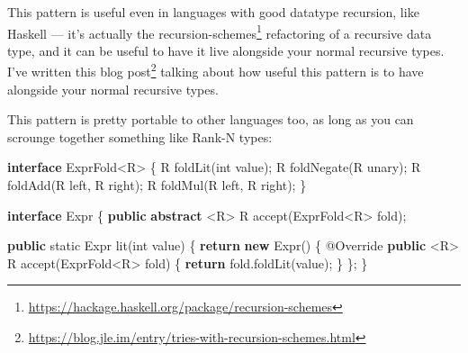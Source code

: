 \documentclass[]{article}
\newenvironment{Shaded}{}{}
\newcommand{\AttributeTok}[1]{\textcolor[rgb]{0.49,0.56,0.16}{#1}}
\newcommand{\ControlFlowTok}[1]{\textcolor[rgb]{0.00,0.44,0.13}{\textbf{#1}}}
\newcommand{\DataTypeTok}[1]{\textcolor[rgb]{0.56,0.13,0.00}{#1}}
\newcommand{\FunctionTok}[1]{\textcolor[rgb]{0.02,0.16,0.49}{#1}}
\newcommand{\KeywordTok}[1]{\textcolor[rgb]{0.00,0.44,0.13}{\textbf{#1}}}
\newcommand{\NormalTok}[1]{#1}
\newcommand{\OperatorTok}[1]{\textcolor[rgb]{0.40,0.40,0.40}{#1}}
\renewcommand{\href}[2]{#2\footnote{\url{#1}}}
\begin{document}
This pattern is useful even in languages with good datatype recursion, like
Haskell --- it's actually the
\href{https://hackage.haskell.org/package/recursion-schemes}{recursion-schemes}
refactoring of a recursive data type, and it can be useful to have it live
alongside your normal recursive types. I've written
\href{https://blog.jle.im/entry/tries-with-recursion-schemes.html}{this blog
post} talking about how useful this pattern is to have alongside your normal
recursive types.

This pattern is pretty portable to other languages too, as long as you can
scrounge together something like Rank-N types:

\begin{Shaded}
\begin{Highlighting}[]
\KeywordTok{interface}\NormalTok{ ExprFold}\OperatorTok{\textless{}}\NormalTok{R}\OperatorTok{\textgreater{}} \OperatorTok{\{}
\NormalTok{    R }\FunctionTok{foldLit}\OperatorTok{(}\DataTypeTok{int}\NormalTok{ value}\OperatorTok{);}
\NormalTok{    R }\FunctionTok{foldNegate}\OperatorTok{(}\NormalTok{R unary}\OperatorTok{);}
\NormalTok{    R }\FunctionTok{foldAdd}\OperatorTok{(}\NormalTok{R left}\OperatorTok{,}\NormalTok{ R right}\OperatorTok{);}
\NormalTok{    R }\FunctionTok{foldMul}\OperatorTok{(}\NormalTok{R left}\OperatorTok{,}\NormalTok{ R right}\OperatorTok{);}
\OperatorTok{\}}

\KeywordTok{interface}\NormalTok{ Expr }\OperatorTok{\{}
    \KeywordTok{public} \KeywordTok{abstract} \OperatorTok{\textless{}}\NormalTok{R}\OperatorTok{\textgreater{}}\NormalTok{ R }\FunctionTok{accept}\OperatorTok{(}\NormalTok{ExprFold}\OperatorTok{\textless{}}\NormalTok{R}\OperatorTok{\textgreater{}}\NormalTok{ fold}\OperatorTok{);}

    \KeywordTok{public} \DataTypeTok{static}\NormalTok{ Expr }\FunctionTok{lit}\OperatorTok{(}\DataTypeTok{int}\NormalTok{ value}\OperatorTok{)} \OperatorTok{\{}
        \ControlFlowTok{return} \KeywordTok{new} \FunctionTok{Expr}\OperatorTok{()} \OperatorTok{\{}
            \AttributeTok{@Override}
            \KeywordTok{public} \OperatorTok{\textless{}}\NormalTok{R}\OperatorTok{\textgreater{}}\NormalTok{ R }\FunctionTok{accept}\OperatorTok{(}\NormalTok{ExprFold}\OperatorTok{\textless{}}\NormalTok{R}\OperatorTok{\textgreater{}}\NormalTok{ fold}\OperatorTok{)} \OperatorTok{\{}
                \ControlFlowTok{return}\NormalTok{ fold}\OperatorTok{.}\FunctionTok{foldLit}\OperatorTok{(}\NormalTok{value}\OperatorTok{);}
            \OperatorTok{\}}
        \OperatorTok{\};}
    \OperatorTok{\}}


\end{Highlighting}
\end{Shaded}
\end{document}
